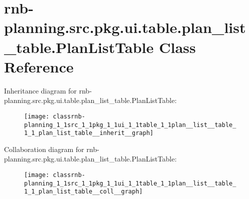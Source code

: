 \hypertarget{classrnb-planning_1_1src_1_1pkg_1_1ui_1_1table_1_1plan__list__table_1_1_plan_list_table}{}\section{rnb-\/planning.src.\+pkg.\+ui.\+table.\+plan\+\_\+list\+\_\+table.\+Plan\+List\+Table Class Reference}
\label{classrnb-planning_1_1src_1_1pkg_1_1ui_1_1table_1_1plan__list__table_1_1_plan_list_table}


Inheritance diagram for rnb-\/planning.src.\+pkg.\+ui.\+table.\+plan\+\_\+list\+\_\+table.\+Plan\+List\+Table\+:\nopagebreak
\begin{figure}[H]
\begin{center}
\leavevmode
\texttt{[image: classrnb-planning\_1\_1src\_1\_1pkg\_1\_1ui\_1\_1table\_1\_1plan\_\_list\_\_table\_1\_1\_plan\_list\_table\_\_inherit\_\_graph]}
\end{center}
\end{figure}


Collaboration diagram for rnb-\/planning.src.\+pkg.\+ui.\+table.\+plan\+\_\+list\+\_\+table.\+Plan\+List\+Table\+:\nopagebreak
\begin{figure}[H]
\begin{center}
\leavevmode
\texttt{[image: classrnb-planning\_1\_1src\_1\_1pkg\_1\_1ui\_1\_1table\_1\_1plan\_\_list\_\_table\_1\_1\_plan\_list\_table\_\_coll\_\_graph]}
\end{center}
\end{figure}
